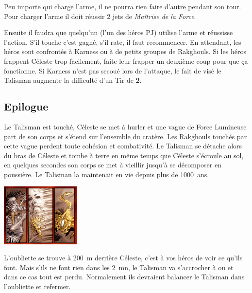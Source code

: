 Peu importe qui charge l’arme, il ne pourra rien faire d’autre pendant son tour. Pour charger l’arme il doit réussir 2 jets de \textit{Maîtrise de la Force}.

Ensuite il faudra que quelqu’un (l’un des héros PJ) utilise l’arme et réussisse l’action. S’il touche c’est gagné, s’il rate, il faut recommencer. En attendant, les héros sont confrontés à Karness ou à de petits groupes de Rakghouls. Si les héros frappent Céleste trop facilement, faite leur frapper un deuxième coup pour que ça fonctionne. Si Karness n’est pas secoué lors de l’attaque, le fait de visé le Talisman augmente la difficulté d’un Tir de \textbf{2}.

\subsection{Epilogue}
Le Talisman est touché, Céleste se met à hurler et une vague de Force Lumineuse part de son corps et s’étend sur l’ensemble du cratère. Les Rakghouls touchés par cette vague perdent toute cohésion et combativité. Le Talisman se détache alors du bras de Céleste et tombe à terre en même temps que Céleste s’écroule au sol, en quelques secondes son corps se met à vieillir jusqu’à se décomposer en poussière. Le Talisman la maintenait en vie depuis plus de 1000~ans.

\noindent\includegraphics[width=\linewidth]{_img/pnjs/celeste-morne-death.png}

L’oubliette se trouve à 200~m derrière Céleste, c’est à vos héros de voir ce qu’ils font. Mais s’ils ne font rien dans les 2~mn, le Talisman va s’accrocher à  ou  et dans ce cas tout est perdu. Normalement ils devraient balancer le Talisman dans l’oubliette et refermer.

